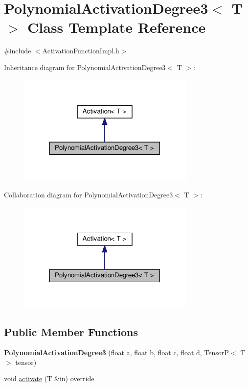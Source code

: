 \hypertarget{classPolynomialActivationDegree3}{}\section{Polynomial\+Activation\+Degree3$<$ T $>$ Class Template Reference}
\label{classPolynomialActivationDegree3}


{\ttfamily \#include $<$Activation\+Function\+Impl.\+h$>$}



Inheritance diagram for Polynomial\+Activation\+Degree3$<$ T $>$\+:
\nopagebreak
\begin{figure}[H]
\begin{center}
\leavevmode
\includegraphics[width=249pt]{classPolynomialActivationDegree3__inherit__graph}
\end{center}
\end{figure}


Collaboration diagram for Polynomial\+Activation\+Degree3$<$ T $>$\+:
\nopagebreak
\begin{figure}[H]
\begin{center}
\leavevmode
\includegraphics[width=249pt]{classPolynomialActivationDegree3__coll__graph}
\end{center}
\end{figure}
\subsection*{Public Member Functions}
\begin{DoxyCompactItemize}
\item 
\mbox{\label{classPolynomialActivationDegree3_ab203d9dff5711cd378babeb455a9cd5a}} 
{\bfseries Polynomial\+Activation\+Degree3} (float a, float b, float c, float d, TensorP$<$ T $>$ tensor)
\item 
void \hyperlink{classPolynomialActivationDegree3_ac68e75e02f29c445e8d8f818fc60bee1}{activate} (T \&in) override
\end{DoxyCompactItemize}
